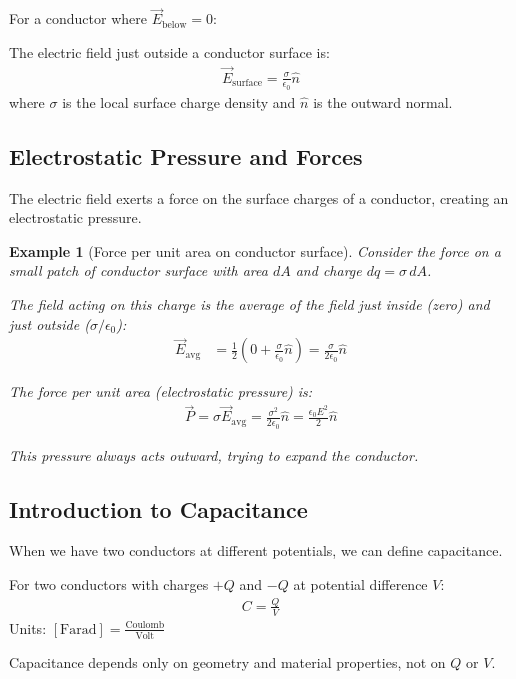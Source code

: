 \documentclass{article}
\newtheorem{example}[theorem]{Example}
\begin{document}
For a conductor where $\vec{E}_{\text{below}} = 0$:
\begin{conceptbox}
The electric field just outside a conductor surface is:
\begin{align*}
    \vec{E}_{\text{surface}} = \frac{\sigma}{\epsilon_0}\hat{n}
\end{align*}
where $\sigma$ is the local surface charge density and $\hat{n}$ is the outward normal.
\end{conceptbox}

\subsection{Electrostatic Pressure and Forces}
The electric field exerts a force on the surface charges of a conductor, creating an electrostatic pressure.

\begin{example}[Force per unit area on conductor surface]
Consider the force on a small patch of conductor surface with area $dA$ and charge $dq = \sigma \, dA$.

The field acting on this charge is the average of the field just inside (zero) and just outside ($\sigma/\epsilon_0$):
\begin{align*}
    \vec{E}_{\text{avg}} &= \frac{1}{2}(0 + \frac{\sigma}{\epsilon_0}\hat{n}) = \frac{\sigma}{2\epsilon_0}\hat{n}
\end{align*}

The force per unit area (electrostatic pressure) is:
\begin{align*}
    \vec{P} = \sigma \vec{E}_{\text{avg}} = \frac{\sigma^2}{2\epsilon_0}\hat{n} = \frac{\epsilon_0 E^2}{2}\hat{n}
\end{align*}

This pressure always acts outward, trying to expand the conductor.
\end{example}

\subsection{Introduction to Capacitance}
When we have two conductors at different potentials, we can define capacitance.

\begin{conceptbox}
For two conductors with charges $+Q$ and $-Q$ at potential difference $V$:
\begin{align*}
    C = \frac{Q}{V}
\end{align*}
Units: $[\text{Farad}] = \frac{\text{Coulomb}}{\text{Volt}}$

Capacitance depends only on geometry and material properties, not on $Q$ or $V$.
\end{conceptbox}
\end{document}
